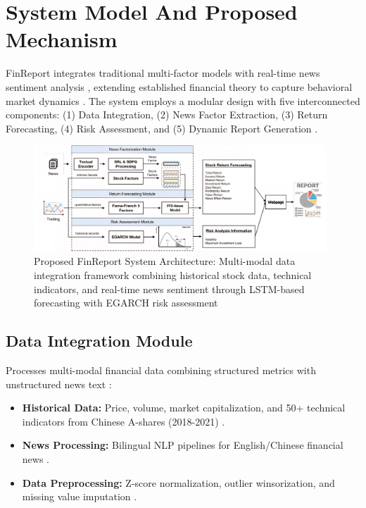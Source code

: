 \documentclass[3p,times,procedia]{elsarticle}
\begin{document}
\section{System Model And Proposed Mechanism}

FinReport integrates traditional multi-factor models \cite{FAMA1993,Carhart1997} with real-time news sentiment analysis \cite{TETLOCK2007}, extending established financial theory to capture behavioral market dynamics \cite{Daniel1998}. The system employs a modular design with five interconnected components: (1) Data Integration, (2) News Factor Extraction, (3) Return Forecasting, (4) Risk Assessment, and (5) Dynamic Report Generation \cite{Fischer2018}.

\begin{figure}[!ht]
    \centering
    \includegraphics[width=0.98\textwidth]{flowchart.jpg}
    \caption{Proposed FinReport System Architecture: Multi-modal data integration framework combining historical stock data, technical indicators, and real-time news sentiment through LSTM-based forecasting with EGARCH risk assessment}
    \label{fig:workflow_diagram}
\end{figure}

\subsection{{Data Integration Module}}

Processes multi-modal financial data combining structured metrics with unstructured news text \cite{Harvey2016}:
\begin{itemize}
\item \textbf{Historical Data:} Price, volume, market capitalization, and 50+ technical indicators from Chinese A-shares (2018-2021) \cite{FinReportDataset2025}.
\item \textbf{News Processing:} Bilingual NLP pipelines for English/Chinese financial news \cite{Loughran2011}.
\item \textbf{Data Preprocessing:} Z-score normalization, outlier winsorization, and missing value imputation \cite{Fischer2018}.
\end{itemize}
\end{document}
